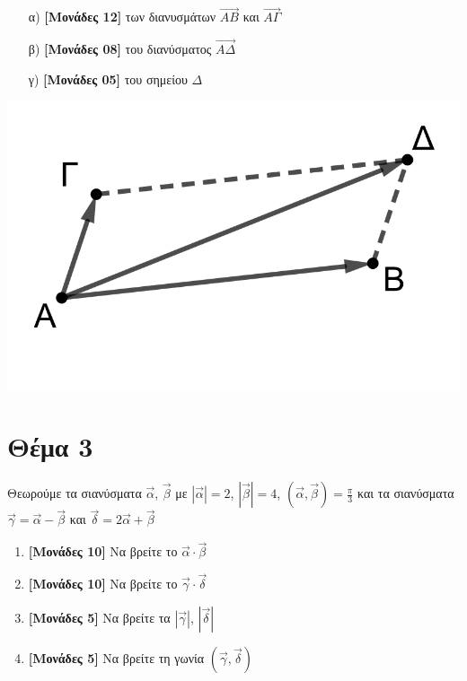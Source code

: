 \documentclass[12pt]{article}
\begin{document}
\begin{enumerate}
 \item [α)] \textbf{[Μονάδες 12]} των διανυσμάτων $\overrightarrow{ΑΒ}$ και $\overrightarrow{ΑΓ}$
 \item [β)] \textbf{[Μονάδες 08]} του διανύσματος $\overrightarrow{ΑΔ}$
 \item [γ)] \textbf{[Μονάδες 05]} του σημείου $Δ$
\end{enumerate}
\includegraphics[scale=0.25]{"2022.png"}

\section*{Θέμα 3}
\noindent
Θεωρούμε τα σιανύσματα $\vec{α}$, $\vec{β}$ με $|\vec{α}|=2$, $|\vec{β}|=4$, $(\vec{α},\vec{β})=\frac{π}{3}$ και τα σιανύσματα $\vec{γ}=\vec{α}-\vec{β}$ και $\vec{δ}=2\vec{α}+\vec{β}$
\begin{enumerate}
 \item \textbf{[Μονάδες 10]} Να βρείτε το $\vec{α}\cdot\vec{β}$
 \item \textbf{[Μονάδες 10]} Να βρείτε το $\vec{γ}\cdot\vec{δ}$
 \item \textbf{[Μονάδες 5]} Να βρείτε τα $|\vec{γ}|$, $|\vec{δ}|$
 \item \textbf{[Μονάδες 5]} Να βρείτε τη γωνία $(\vec{γ},\vec{δ})$
\end{enumerate}
\end{document}

